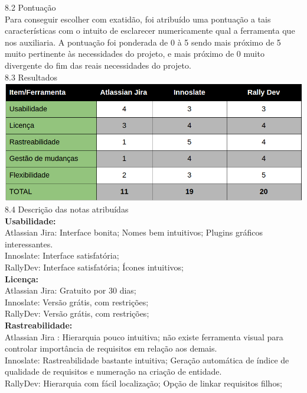 {{\large{8.2 Pontuação}}\\

\tab Para conseguir escolher com exatidão, foi atribuído uma pontuação a tais características com o intuito de esclarecer numericamente qual a ferramenta que nos auxiliaria. A pontuação foi ponderada de 0 à 5 sendo mais próximo de 5 muito pertinente às necessidades do projeto, e mais próximo de 0 muito divergente do fim das reais necessidades do projeto.\\

{\large{8.3 Resultados}}\\

\includegraphics[width=1\textwidth]{conteudo/resultados}\\

{\large{8.4 Descrição das notas atribuídas}}\\

\textbf{Usabilidade:}\\
	\tab Atlassian Jira: Interface bonita; Nomes bem intuitivos; Plugins gráficos interessantes.\\
	\tab Innoslate: Interface satisfatória; \\
	\tab RallyDev: Interface satisfatória; Ícones intuitivos;\\

\textbf{Licença:}\\
	\tab Atlassian Jira: Gratuito por 30 dias;\\
	\tab Innoslate: Versão grátis, com restrições;\\
	\tab RallyDev: Versão grátis, com restrições;\\

\textbf{Rastreabilidade:}\\
	\tab Atlassian Jira : Hierarquia pouco intuitiva; não existe ferramenta visual para controlar importância de requisitos em relação aos demais.\\
	\tab Innoslate: Rastreabilidade bastante intuitiva; Geração automática de índice de qualidade de requisitos e numeração na criação de entidade.\\
	\tab RallyDev: Hierarquia com fácil localização; Opção de linkar requisitos filhos;\\

}
